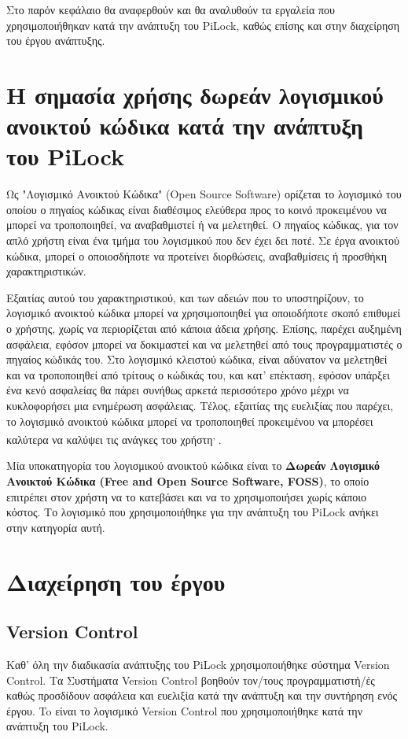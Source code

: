 Στο παρόν κεφάλαιο θα αναφερθούν και θα αναλυθούν τα εργαλεία που χρησιμοποιήθηκαν κατά την ανάπτυξη του PiLock, καθώς επίσης και στην διαχείρηση του έργου ανάπτυξης.

\section{Η σημασία χρήσης δωρεάν λογισμικού ανοικτού κώδικα κατά την ανάπτυξη του PiLock}
	Ως "Λογισμικό Ανοικτού Κώδικα" (Open Source Software) ορίζεται το λογισμικό του οποίου ο πηγαίος κώδικας είναι διαθέσιμος ελεύθερα προς το κοινό προκειμένου να μπορεί να τροποποιηθεί, να αναβαθμιστεί ή να μελετηθεί. Ο πηγαίος κώδικας, για τον απλό χρήστη είναι ένα τμήμα του λογισμικού που δεν έχει δει ποτέ. Σε έργα ανοικτού κώδικα, μπορεί ο οποιοσδήποτε να προτείνει διορθώσεις, αναβαθμίσεις ή προσθήκη χαρακτηριστικών\textsuperscript{\cite{FOSS_def}}. 

	Εξαιτίας αυτού του χαρακτηριστικού, και των αδειών που το υποστηρίζουν, το λογισμικό ανοικτού κώδικα μπορεί να χρησιμοποιηθεί για οποιοδήποτε σκοπό επιθυμεί ο χρήστης, χωρίς να περιορίζεται από κάποια άδεια χρήσης. Επίσης, παρέχει αυξημένη ασφάλεια, εφόσον μπορεί να δοκιμαστεί και να μελετηθεί από τους προγραμματιστές ο πηγαίος κώδικάς του. Στο λογισμικό κλειστού κώδικα, είναι αδύνατον να μελετηθεί και να τροποποιηθεί από τρίτους ο κώδικάς του, και κατ' επέκταση, εφόσον υπάρξει ένα κενό ασφαλείας θα πάρει συνήθως αρκετά περισσότερο χρόνο μέχρι να κυκλοφορήσει μια ενημέρωση ασφάλειας. Τέλος, εξαιτίας της ευελιξίας που παρέχει, το λογισμικό ανοικτού κώδικα μπορεί να τροποποιηθεί προκειμένου να μπορέσει καλύτερα να καλύψει τις ανάγκες του χρήστη\textsuperscript{\cite{FOSS_def}, \cite{FOSS_benefits}}.

	Μία υποκατηγορία του λογισμικού ανοικτού κώδικα είναι το \textbf{Δωρεάν Λογισμικό Ανοικτού Κώδικα (Free and Open Source Software, FOSS)}, το οποίο επιτρέπει στον χρήστη να το κατεβάσει και να το χρησιμοποιήσει χωρίς κάποιο κόστος. Το λογισμικό που χρησιμοποιήθηκε για την ανάπτυξη του PiLock ανήκει στην κατηγορία αυτή.

\section{Διαχείρηση του έργου}

	\subsection{Version Control}
		\label{subsec:vc}
		Καθ' όλη την διαδικασία ανάπτυξης του PiLock χρησιμοποιήθηκε σύστημα Version Control. Τα Συστήματα Version Control βοηθούν τον/τους προγραμματιστή/ές καθώς προσδίδουν ασφάλεια και ευελιξία κατά την ανάπτυξη και την συντήρηση ενός έργου. To  είναι το λογισμικό Version Control που χρησιμοποιήθηκε κατά την ανάπτυξη του PiLock.

